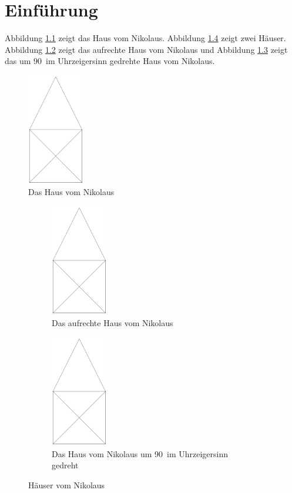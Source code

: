 \documentclass[12pt,a4paper,final]{scrbook}
\begin{document}
\listoffigures
\chapter{Einführung}
Abbildung \ref{fig:Nikolaushaus1} zeigt das Haus vom Nikolaus. 
Abbildung \ref{fig:Nikolaushaus2} zeigt zwei Häuser. 
Abbildung \ref{fig:NikolaushausA} zeigt das aufrechte Haus vom Nikolaus und Abbildung \ref{fig:NikolaushausB} zeigt das um 90\textdegree~im Uhrzeigersinn gedrehte Haus vom Nikolaus. 

\begin{figure}[b]
	\centering
	\includegraphics[width=2.5cm]{house.png}
	\caption{Das Haus vom Nikolaus}
	\label{fig:Nikolaushaus1}
\end{figure} 

\begin{figure}[h!tb]
	\begin{subfigure}[b]{.49\textwidth} 
		\centering
		\includegraphics[width=2.5cm]{house.png}
		\caption{Das aufrechte Haus vom Nikolaus}
		\label{fig:NikolaushausA}
	\end{subfigure}
	\hfil
	\begin{subfigure}[b]{.49\textwidth}
		\centering
		\includegraphics[width=2.5cm,angle=270]{house.png}
		\caption{Das Haus vom Nikolaus um 90\textdegree~im Uhrzeigersinn gedreht} 
		\label{fig:NikolaushausB}
	\end{subfigure}
\caption{Häuser vom Nikolaus}
\label{fig:Nikolaushaus2}
\end{figure} 
\end{document}
